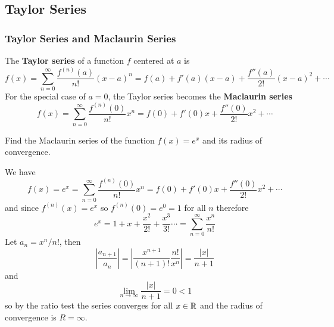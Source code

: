 \subsection{Taylor Series}

\subsubsection*{Taylor Series and Maclaurin Series}
The \textbf{Taylor series} of a function \(f\) centered at \(a\) is
\[f(x)=\sum_{n=0}^{\infty}\frac{f^{(n)}(a)}{n!}(x-a)^n
=f(a)+f'(a)(x-a)+\frac{f''(a)}{2!}(x-a)^2+\cdots\]
For the special case of \(a=0\), the Taylor series becomes the
\textbf{Maclaurin series}
\[f(x)=\sum_{n=0}^{\infty}\frac{f^{(n)}(0)}{n!}x^n
=f(0)+f'(0)x+\frac{f''(0)}{2!}x^2+\cdots\]
\begin{problem}
    Find the Maclaurin series of the function \(f(x)=e^x\) and its radius of
    convergence.
\end{problem}
\begin{solution}
    We have
    \[f(x)=e^x=\sum_{n=0}^{\infty}\frac{f^{(n)}(0)}{n!}x^n
    =f(0)+f'(0)x+\frac{f''(0)}{2!}x^2+\cdots\]
    and since \(f^{(n)}(x)=e^x\) so \(f^{(n)}(0)=e^0=1\) for all \(n\)
    therefore
    \[e^x=1+x+\frac{x^2}{2!}+\frac{x^3}{3!}\cdots
    =\sum_{n=0}^\infty\frac{x^n}{n!}\]
    Let \(a_n=x^n/n!\), then
    \[\left|\frac{a_{n+1}}{a_n}\right|
    =\left|\frac{x^{n+1}}{(n+1)!}\frac{n!}{x^n}\right|=\frac{|x|}{n+1}\]
    and
    \[\lim_{n\to\infty}\frac{|x|}{n+1}=0<1\]
    so by the ratio test the series converges for all \(x\in\mathbb{R}\) and the
    radius of convergence is \(R=\infty\).
\end{solution}

